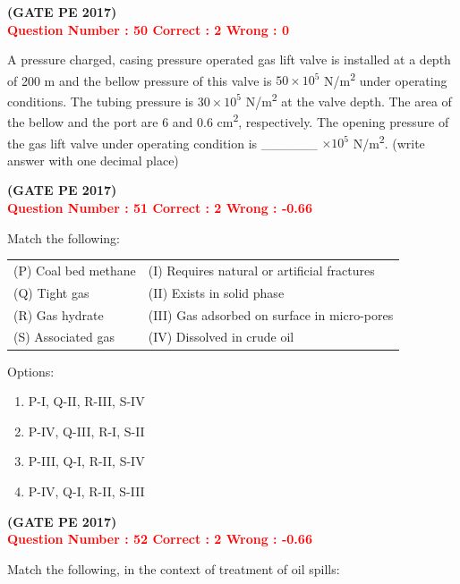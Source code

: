 \documentclass[journal,12pt,onecolumn]{article}
\begin{document}
{\hfill\textbf{(GATE PE 2017)}\\[0.6cm]


\textcolor{red}{\textbf{Question Number : 50 \hfill Correct : 2  Wrong : 0}}


A pressure charged, casing pressure operated gas lift valve is installed at a depth of 200 m and the bellow pressure of this valve is $50 \times 10^5$ N/m\textsuperscript{2} under operating conditions. The tubing pressure is $30 \times 10^5$ N/m\textsuperscript{2} at the valve depth. The area of the bellow and the port are 6 and 0.6 cm\textsuperscript{2}, respectively. The opening pressure of the gas lift valve under operating condition is \_\_\_\_\_\_ $\times 10^5$ N/m\textsuperscript{2}. (write answer with one decimal place)

\hfill\textbf{(GATE PE 2017)}\\[0.6cm]


\textcolor{red}{\textbf{Question Number : 51 \hfill Correct : 2  Wrong : -0.66}}


Match the following:\\[0.6cm]

\begin{tabular}{ll}
(P) Coal bed methane & (I) Requires natural or artificial fractures \\
(Q) Tight gas        & (II) Exists in solid phase \\
(R) Gas hydrate      & (III) Gas adsorbed on surface in micro-pores \\
(S) Associated gas   & (IV) Dissolved in crude oil \\
\end{tabular}


Options:
\begin{enumerate}[label=(\Alph*)]
    \item P-I, Q-II, R-III, S-IV  
    \item P-IV, Q-III, R-I, S-II  
    \item P-III, Q-I, R-II, S-IV  
    \item P-IV, Q-I, R-II, S-III  
\end{enumerate}
\hfill\textbf{(GATE PE 2017)}\\[0.6cm]

\textcolor{red}{\textbf{Question Number : 52 \hfill Correct : 2  Wrong : -0.66}}


Match the following, in the context of treatment of oil spills:\\[0.6cm]


}
\end{document}
